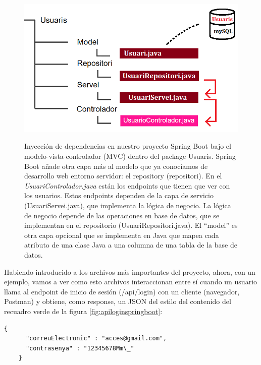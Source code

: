 \documentclass[a4paper,12pt]{report}
\begin{document}
				\FloatBarrier
				\setlength{\belowcaptionskip}{3pt}
				\begin{figure}[H]
					\centering
					\caption{Inyección de dependencias en nuestro proyecto Spring Boot bajo el modelo-vista-controlador (MVC) dentro del package Usuaris. Spring Boot añade otra capa más al modelo que ya conocíamos de desarrollo web entorno servidor: el repository (repositori). En el \textit{UsuariControlador.java} están los endpoints que tienen que ver con los usuarios. Estos endpoints dependen de la capa de servicio (UsuariServei.java), que implementa la lógica de negocio. La lógica de negocio depende de las operaciones en base de datos, que se implementan en el repositorio (UsuariRepositori.java). El ``model'' es otra capa opcional que se implementa en Java que mapea cada atributo de una clase Java a una columna de una tabla de la base de datos.}
					\includegraphics[width=1\linewidth]{img/diagramaInjeccioDependencies}
					\label{fig:diagramaInjeccioDependencies}
				\end{figure}
				\FloatBarrier
					
				Habiendo introducido a los archivos más importantes del proyecto, ahora, con un ejemplo, vamos a ver como esto archivos interaccionan entre sí cuando un usuario llama al endpoint de inicio de sesión (/api/login) con un cliente (navegador, Postman) y obtiene, como response, un JSON del estilo del contenido del recuadro verde de la figura \ref{fig:apiloginspringboot}:
				
			\begin{lstlisting}[language=xml, basicstyle=\ttfamily\footnotesize, keywordstyle=\color{magenta}]
	{
	  "correuElectronic" : "acces@gmail.com", 
	  "contrasenya" : "12345678Mm\_" 
	}
			\end{lstlisting}
\end{document}
